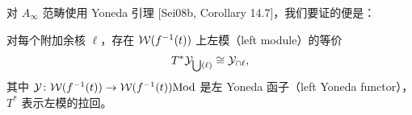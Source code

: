 
对 $A_\infty$ 范畴使用 Yoneda 引理 [Sei08b, Corollary 14.7]，我们要证的便是：

\begin{theorem}\label{thm:4-2-1}
对每个附加余核 $\ell$，存在 $\mathcal{W}(f^{-1}(t))$ 上左模（left module）的等价
\[
T^*\mathcal{Y}_{\bigcup(\ell)}\cong\mathcal{Y}_{\cap\ell},
\]
其中 $\mathcal{Y}\colon\mathcal{W}(f^{-1}(t))\to\mathcal{W}(f^{-1}(t))\mathrm{Mod}$ 是左 Yoneda 函子（left Yoneda functor），
$T^*$ 表示左模的拉回。
\end{theorem}


